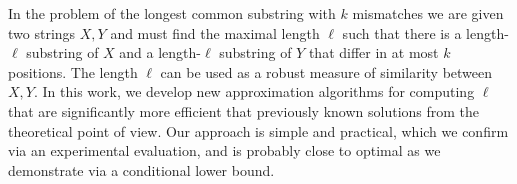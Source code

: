 

\newcommand{\inputLCS}[1]{}
\newcommand{\figLCS}[2]{\texttt{[image: Part\_Two/lcs/\#2]}}

\newcommand{\lcpe}{\mathrm{LCP}_{(1+\eps)k}}
\newcommand{\lcp}{\mathrm{LCP}_{\tilde{k}}}
\newcommand{\lcpk}{\mathrm{LCP}_{k}}
\newcommand{\lcsk}{\mathrm{LCS}_{k}}
\newcommand{\lcske}{\mathrm{LCS}_{(1+\eps)k}}
\newcommand{\lcsak}{\mathrm{LCS}_{\tilde{k}}}
\newcommand{\sk}{\mathrm{sk}}
\newcommand{\Prob}{\mathrm{Pr}}
\newcommand{\LCSp}{\textsf{LCS}\xspace}
\newcommand{\kLCS}{\textsf{LCS with $k$ Mismatches}\xspace}
\newcommand{\kApproxLCS}{\textsf{LCS with Approximately $k$ Mismatches}\xspace}
\newcommand{\Bichromatic}{\textsf{$(1+\gamma)$-approximate Bichromatic Closest Pair}\xspace}
\newcommand{\NN}{\textsf{Approximate Near Neighbour}\xspace}
\newcommand{\twentyquestions}{\textsf{Twenty Questions}\xspace}
\newcommand{\Carole}{\mathit{Carole}}
\newcommand{\pop}{\mathit{pop}}
\newcommand{\push}{\mathit{push}}
\newcommand{\ttop}{\mathit{top}}
\newcommand{\mmid}{\mathit{mid}}

\newcommand{\Hashes}{\mathcal{H}}
\newcommand{\Collisions}{C}
\newcommand{\Bad}{B}
\newcommand{\Projections}{\Pi}
\newcommand{\Pos}{\mathsf{P}}
\newcommand{\HD}{d_H}

\providecommand{\LCP}{\mathrm{LCP}}
\providecommand{\ceil}[1]{\ensuremath{\lceil#1\rceil}}
\providecommand{\eps}{\varepsilon}

\newcommand{\norm}[1]{\ensuremath{\lVert#1\rVert}}

\newcommand\restr[2]{{
  \left.\kern-\nulldelimiterspace
  #1 
  \vphantom{\big|}
  \right|_{#2} 
}}

\begin{small}
    In the problem of the longest common substring with $k$ mismatches we are given two strings $X, Y$ and must find the maximal length $\ell$ such that there is a length-$\ell$ substring of $X$ and a length-$\ell$ substring of $Y$ that differ in at most $k$ positions. The length $\ell$ can be used as a robust measure of similarity between $X, Y$. In this work, we develop new approximation algorithms for computing $\ell$ that are significantly more efficient that previously known solutions from the theoretical point of view. Our approach is simple and practical, which we confirm via an experimental evaluation, and is probably close to optimal as we demonstrate via a conditional lower bound.
\end{small}


